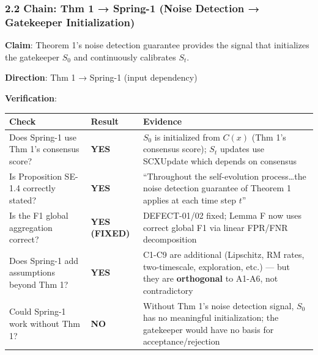 \documentclass[
  12pt,
]{article}
\begin{document}
\subsubsection{2.2 Chain: Thm 1 → Spring-1 (Noise Detection → Gatekeeper
Initialization)}\label{chain-thm-1-spring-1-noise-detection-gatekeeper-initialization}

\textbf{Claim}: Theorem 1's noise detection guarantee provides the
signal that initializes the gatekeeper \(S_0\) and continuously
calibrates \(S_t\).

\textbf{Direction}: Thm 1 → Spring-1 (input dependency)

\textbf{Verification}:

\begin{longtable}[]{@{}
  >{\raggedright\arraybackslash}p{}
  >{\raggedright\arraybackslash}p{}
  >{\raggedright\arraybackslash}p{}@{}}
\toprule\noalign{}
\begin{minipage}[b]{\linewidth}\raggedright
Check
\end{minipage} & \begin{minipage}[b]{\linewidth}\raggedright
Result
\end{minipage} & \begin{minipage}[b]{\linewidth}\raggedright
Evidence
\end{minipage} \\
\midrule\noalign{}
\endhead
\bottomrule\noalign{}
\endlastfoot
Does Spring-1 use Thm 1's consensus score? & \textbf{YES} & \(S_0\) is
initialized from \(C(x)\) (Thm 1's consensus score); \(S_t\) updates use
SCXUpdate which depends on consensus \\
Is Proposition SE-1.4 correctly stated? & \textbf{YES} & ``Throughout
the self-evolution process\ldots the noise detection guarantee of
Theorem 1 applies at each time step \(t\)'' \\
Is the F1 global aggregation correct? & \textbf{YES (FIXED)} &
DEFECT-01/02 fixed; Lemma F now uses correct global F1 via linear
FPR/FNR decomposition \\
Does Spring-1 add assumptions beyond Thm 1? & \textbf{YES} & C1-C9 are
additional (Lipschitz, RM rates, two-timescale, exploration, etc.) ---
but they are \textbf{orthogonal} to A1-A6, not contradictory \\
Could Spring-1 work without Thm 1? & \textbf{NO} & Without Thm 1's noise
detection signal, \(S_0\) has no meaningful initialization; the
gatekeeper would have no basis for acceptance/rejection \\
\end{longtable}
\end{document}
